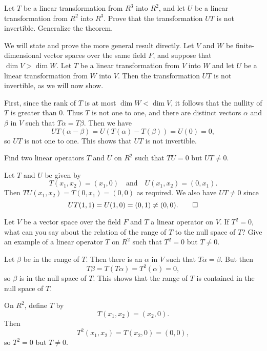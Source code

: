  Let $T$ be a linear transformation from $R^3$ into $R^2$,
and let $U$ be a linear transformation from $R^2$ into $R^3$. Prove
that the transformation $UT$ is not invertible. Generalize the
theorem.
\begin{solution}
  We will state and prove the more general result directly. Let $V$
  and $W$ be finite-dimensional vector spaces over the same field $F$,
  and suppose that $\dim V > \dim W$. Let $T$ be a linear
  transformation from $V$ into $W$ and let $U$ be a linear
  transformation from $W$ into $V$. Then the transformation $UT$ is
  not invertible, as we will now show.

  First, since the rank of $T$ is at most $\dim W < \dim V$, it
  follows that the nullity of $T$ is greater than $0$. Thus $T$ is not
  one to one, and there are distinct vectors $\alpha$ and $\beta$ in
  $V$ such that $T\alpha = T\beta$. Then we have
  \begin{equation*}
    UT(\alpha - \beta) = U(T(\alpha) - T(\beta)) = U(0) = 0,
  \end{equation*}
  so $UT$ is not one to one. This shows that $UT$ is not invertible.
\end{solution}

 Find two linear operators $T$ and $U$ on $R^2$ such that
$TU = 0$ but $UT \neq 0$.
\begin{solution}
  Let $T$ and $U$ be given by
  \begin{equation*}
    T(x_1,x_2) = (x_1,0) \quad\text{and}\quad
    U(x_1,x_2) = (0,x_1).
  \end{equation*}
  Then $TU(x_1,x_2) = T(0,x_1) = (0, 0)$ as required. We also have
  $UT\neq0$ since
  \begin{equation*}
    UT(1,1) = U(1,0) = (0,1) \neq (0,0). \qedhere
  \end{equation*}
\end{solution}

 Let $V$ be a vector space over the field $F$ and $T$ a
linear operator on $V$. If $T^2 = 0$, what can you say about the
relation of the range of $T$ to the null space of $T$? Give an example
of a linear operator $T$ on $R^2$ such that $T^2 = 0$ but $T\neq0$.
\begin{solution}
  Let $\beta$ be in the range of $T$. Then there is an $\alpha$ in $V$
  such that $T\alpha = \beta$. But then
  \begin{equation*}
    T\beta = T(T\alpha) = T^2(\alpha) = 0,
  \end{equation*}
  so $\beta$ is in the null space of $T$. This shows that the range of
  $T$ is contained in the null space of $T$.

  On $R^2$, define $T$ by
  \begin{equation*}
    T(x_1,x_2) = (x_2,0).
  \end{equation*}
  Then
  \begin{equation*}
    T^2(x_1,x_2) = T(x_2,0) = (0, 0),
  \end{equation*}
  so $T^2 = 0$ but $T\neq0$.
\end{solution}


